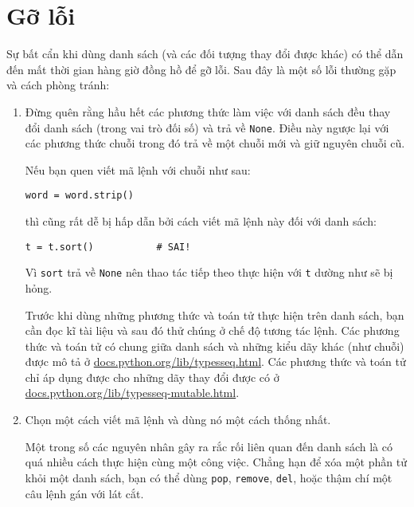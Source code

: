 \documentclass[11pt]{book}
\begin{document}
\section{Gỡ lỗi}

Sự bất cẩn khi dùng danh sách (và các đối tượng thay đổi được khác)
có thể dẫn đến mất thời gian hàng giờ đồng hồ để gỡ lỗi. Sau đây là
một số lỗi thường gặp và cách phòng tránh:

\begin{enumerate}

\item Đừng quên rằng hầu hết các phương thức làm việc với danh sách
  đều thay đổi danh sách (trong vai trò đối số) và trả về
  {\tt None}. Điều này ngược lại với các phương thức chuỗi
  trong đó trả về một chuỗi mới và giữ nguyên chuỗi cũ.
  
Nếu bạn quen viết mã lệnh với chuỗi như sau:

\beforeverb
\begin{verbatim}
word = word.strip()
\end{verbatim}
\afterverb

thì cũng rất dễ bị hấp dẫn bởi cách viết mã lệnh này đối với danh sách:

\beforeverb
\begin{verbatim}
t = t.sort()           # SAI!
\end{verbatim}
\afterverb


Vì {\tt sort} trả về {\tt None} nên thao tác tiếp theo
thực hiện với {\tt t} dường như sẽ bị hỏng.

Trước khi dùng những phương thức và toán tử thực hiện trên danh sách, bạn 
cần đọc kĩ tài liệu và sau đó thử chúng ở chế độ tương tác lệnh. Các
phương thức và toán tử có chung giữa danh sách và những kiểu dãy khác
(như chuỗi) được mô tả ở \url{docs.python.org/lib/typesseq.html}.
Các phương thức và toán tử chỉ áp dụng được cho những dãy thay đổi
được có ở \url{docs.python.org/lib/typesseq-mutable.html}.


\item Chọn một cách viết mã lệnh và dùng nó một cách thống nhất.

Một trong số các nguyên nhân gây ra rắc rối liên quan đến
danh sách là có quá nhiều cách thực hiện cùng một công việc.
Chẳng hạn để xóa một phần tử khỏi một danh sách, bạn có thể dùng
{\tt pop}, {\tt remove}, {\tt del}, hoặc thậm chí một câu lệnh
gán với lát cắt.


\end{enumerate}
\end{document}

